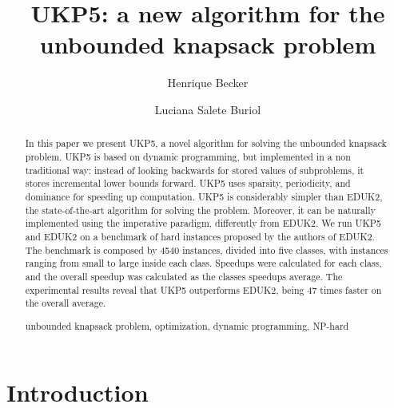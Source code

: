 \documentclass[runningheads,a4paper]{llncs}
\newcommand{\keywords}[1]{\par\addvspace\baselineskip
\noindent\keywordname\enspace\ignorespaces#1}
\begin{document}
\mainmatter  %

\title{UKP5: a new algorithm for the unbounded knapsack problem}


\author{Henrique Becker \and Luciana Salete Buriol}


\maketitle

\begin{abstract}
In this paper we present UKP5, a novel algorithm for solving the unbounded knapsack problem. UKP5 is based on dynamic programming, but implemented in a non traditional way: instead of looking backwards for stored values of subproblems, it stores incremental lower bounds forward. UKP5 uses sparsity, periodicity, and dominance for speeding up computation. UKP5 is considerably simpler than EDUK2, the state-of-the-art algorithm for solving the problem. Moreover, it can be naturally implemented using the imperative paradigm, differently from EDUK2. We run UKP5 and EDUK2 on a benchmark of hard instances proposed by the authors of EDUK2. The benchmark is composed by 4540 instances, divided into five classes, with instances ranging from small to large inside each class. Speedups were calculated for each class, and the overall speedup was calculated as the classes speedups average. The experimental results reveal that UKP5 outperforms EDUK2, being 47 times faster on the overall average.
\keywords{unbounded knapsack problem, optimization, dynamic programming, NP-hard}
\end{abstract}

\section{Introduction}
\end{document}
